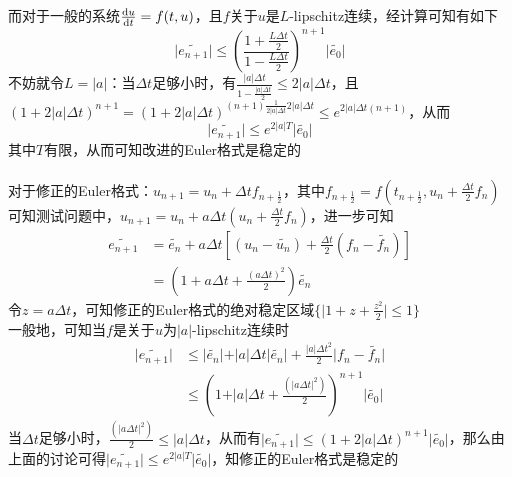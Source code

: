 \documentclass[12pt]{article}
\begin{document}
\noindent 而对于一般的系统$\frac{{\rm d}u}{{\rm d}t}=f(t,u)$，且$f$关于$u$是$L$-lipschitz连续，经计算可知有如下$$\vert \widetilde{e_{n+1}}\vert \le(\frac{1+\frac{L\Delta{t}}{2}}{1-\frac{L\Delta{t}}{2}})^{n+1}\vert \widetilde{e_0}\vert$$
不妨就令$L=\vert a\vert$：当$\Delta{t}$足够小时，有$\frac{\vert a\vert\Delta{t}}{1-\frac{\vert a\vert\Delta{t}}{2}}\le2\vert a \vert\Delta{t}$，且$(1+2\vert a\vert\Delta{t})^{n+1}=(1+2\vert a\vert\Delta{t})^{(n+1)\frac{1}{2\vert a\vert\Delta{t}}2\vert a\vert\Delta{t}}\le e^{2\vert a\vert\Delta{t}(n+1)}$，从而$$\vert \widetilde{e_{n+1}}\vert\le e^{2\vert a\vert T}\vert \widetilde{e_0}\vert$$其中$T$有限，从而可知改进的Euler格式是稳定的\\

\\


\noindent 对于修正的Euler格式：$u_{n+1}=u_n+\Delta{t}f_{n+\frac{1}{2}}$，其中$f_{n+\frac{1}{2}}=f(t_{n+\frac{1}{2}},u_n+\frac{\Delta{t}}{2}f_n)$\\
可知测试问题中，$u_{n+1}=u_n+a\Delta{t}(u_n+\frac{\Delta{t}}{2}f_n)$，进一步可知
\begin{align*}
	\widetilde{e_{n+1}}&=\widetilde{e_{n}}+ a \Delta{t}[(u_n-\widetilde{u_n})+\frac{\Delta{t}}{2}(f_n-\widetilde{f_n})]\\
	&=(1+ a\Delta{t}+\frac{( a\Delta{t})^2}{2})\widetilde{e_{n}}
\end{align*}
\noindent 令$z= a \Delta{t}$，可知修正的Euler格式的绝对稳定区域$\{\vert 1+z+ \frac{z^2}{2} \vert \le1\}$\\
一般地，可知当$f$是关于$u$为$\vert a\vert$-lipschitz连续时
\begin{align*}
	\vert\widetilde{e_{n+1}}\vert&\le \vert \widetilde{e_{n}}\vert + \vert a\vert \Delta{t}\vert \widetilde{e_{n}}\vert +\frac{\vert a\vert \Delta{t}^2}{2}\vert f_n-\widetilde{f_n}\vert\\
	&\le(1+\vert a\vert\Delta{t} + \frac{(\vert a \Delta{t}\vert^2)}{2})^{n+1}\vert \widetilde{e_0}\vert
\end{align*}
当$\Delta{t}$足够小时，$\frac{(\vert a \Delta{t}\vert^2)}{2}\le \vert a\vert\Delta{t} $，从而有$\vert\widetilde{e_{n+1}}\vert\le (1+2\vert a\vert \Delta{t})^{n+1}\vert \widetilde{e_0}\vert$，那么由上面的讨论可得$\vert\widetilde{e_{n+1}}\vert\le e^{2\vert a\vert T}\vert \widetilde{ e_0}\vert$，知修正的Euler格式是稳定的\\
\end{document}
